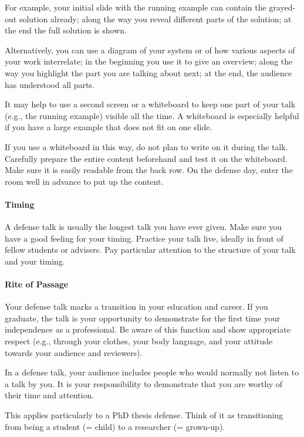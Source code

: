 \documentclass[12pt]{article}
\begin{document}
For example, your initial slide with the running example can contain the grayed-out solution already; along the way you reveal different parts of the solution; at the end the full solution is shown.

Alternatively, you can use a diagram of your system or of how various aspects of your work interrelate; in the beginning you use it to give an overview; along the way you highlight the part you are talking about next; at the end, the audience has understood all parts.
\medskip

It may help to use a second screen or a whiteboard to keep one part of your talk (e.g., the running example) visible all the time.
A whiteboard is especially helpful if you have a large example that does not fit on one slide.

If you use a whiteboard in this way, do not plan to write on it during the talk.
Carefully prepare the entire content beforehand and test it on the whiteboard. Make sure it is easily readable from the back row.
On the defense day, enter the room well in advance to put up the content.

\paragraph{Timing}
A defense talk is usually the longest talk you have ever given.
Make sure you have a good feeling for your timing.
Practice your talk live, ideally in front of fellow students or advisers.
Pay particular attention to the structure of your talk and your timing.

\paragraph{Rite of Passage}
Your defense talk marks a transition in your education and career.
If you graduate, the talk is your opportunity to demonstrate for the first time your independence as a professional.
Be aware of this function and show appropriate respect (e.g., through your clothes, your body language, and your attitude towards your audience and reviewers).
\medskip

In a defense talk, your audience includes people who would normally not listen to a talk by you.
It is your responsibility to demonstrate that you are worthy of their time and attention.
\medskip

This applies particularly to a PhD thesis defense.
Think of it as transitioning from being a student (= child) to a researcher (= grown-up).
\end{document}
